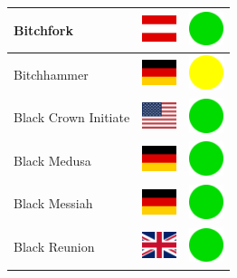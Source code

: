\documentclass[12pt, a4paper, twoside]{report}
\begin{document}
\begin{center}
\begin{longtable}{|p{5cm}|p{2cm}|p{2cm}|}
 Bitchfork                                                  & \includegraphics[width=1cm]{../img/flags/at} &   \includegraphics[width=1cm]{../likes/y} \\ \hline
 Bitchhammer                                                & \includegraphics[width=1cm]{../img/flags/de} &   \includegraphics[width=1cm]{../likes/m} \\ \hline
 Black Crown Initiate                                       & \includegraphics[width=1cm]{../img/flags/us} &   \includegraphics[width=1cm]{../likes/y} \\ \hline
 Black Medusa                                               & \includegraphics[width=1cm]{../img/flags/de} &   \includegraphics[width=1cm]{../likes/y} \\ \hline
 Black Messiah                                              & \includegraphics[width=1cm]{../img/flags/de} &   \includegraphics[width=1cm]{../likes/y} \\ \hline
 Black Reunion                                              & \includegraphics[width=1cm]{../img/flags/gb} &   \includegraphics[width=1cm]{../likes/y} \\ \hline

\end{longtable}
\end{center}
\end{document}
